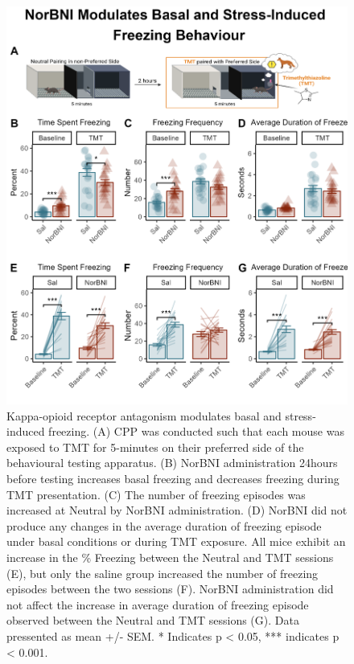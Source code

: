 \documentclass[
]{book}
\begin{document}
\begin{figure}
\includegraphics[width=25in]{Cartoons/Frz_Panel} \caption{Kappa-opioid receptor antagonism modulates basal and stress-induced freezing. (A) CPP was conducted such that each mouse was exposed to TMT for 5-minutes on their preferred side of the behavioural testing apparatus. (B) NorBNI administration 24hours before testing increases basal freezing and decreases freezing during TMT presentation. (C) The number of freezing episodes was increased at Neutral by NorBNI administration. (D) NorBNI did not produce any changes in the average duration of freezing episode under basal conditions or during TMT exposure. All mice exhibit an increase in the \% Freezing between the Neutral and TMT sessions (E), but only the saline group increased the number of freezing episodes between the two sessions (F). NorBNI administration did not affect the increase in average duration of freezing episode observed between the Neutral and TMT sessions (G). Data pressented as mean +/- SEM. * Indicates p < 0.05, *** indicates p < 0.001.}\label{fig:unnamed-chunk-10}
\end{figure}
\end{document}
